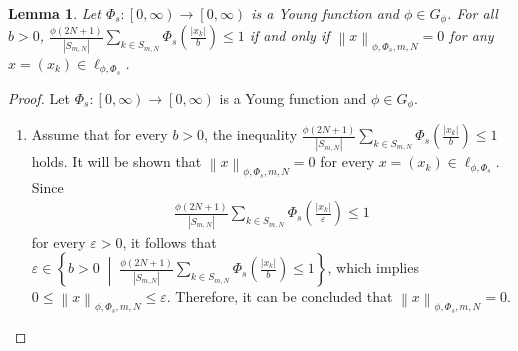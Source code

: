 \documentclass[12pt,a4paper]{article}
\newtheorem{lemma}[definition]{Lemma}
\theoremstyle{remark}
\begin{document}
\begin{lemma}
    Let  $\Phi_s : \left[0, \infty\right) \rightarrow \left[0, \infty\right)$ is a Young function and $\phi\in G_\phi$. For all $b>0$, $\frac{\phi\left(2N+1\right)}{\left|S_{m,N}\right|}\sum_{k\in S_{m,N}}\Phi_s\left(\frac{\left|x_k\right|}{b}\right)\leq1$ if and only if $\left\lVert x\right\rVert _{\phi,\Phi_s,m,N}=0$ for any $x=\left(x_k\right)\in\ell_{\phi,\Phi_s}$.
\end{lemma}

\begin{proof}
    Let  $\Phi_s : \left[0, \infty\right) \rightarrow \left[0, \infty\right)$ is a Young function and $\phi\in G_\phi$.
    \begin{enumerate}
        \item [$(\Leftarrow)$] Assume that for every $b > 0$, the inequality $\frac{\phi(2N+1)}{\left|S_{m,N}\right|} \sum_{k \in S_{m,N}} \Phi_s\left(\frac{\left|x_k\right|}{b}\right) \leq 1$ holds. It will be shown that $\left\lVert x \right\rVert_{\phi, \Phi_s, m, N} = 0$ for every $x = \left(x_k\right) \in \ell_{\phi, \Phi_s}$.\\
        Since 
        \begin{eqnarray*}
            \frac{\phi(2N+1)}{\left|S_{m,N}\right|} \sum_{k \in S_{m,N}} \Phi_s\left(\frac{\left|x_k\right|}{\varepsilon}\right) \leq 1
        \end{eqnarray*}
        for every $\varepsilon > 0$, it follows that $\varepsilon \in \left\{b > 0 \;\middle|\; \frac{\phi(2N+1)}{\left|S_{m,N}\right|} \sum_{k \in S_{m,N}} \Phi_s\left(\frac{\left|x_k\right|}{b}\right) \leq 1\right\}$, which implies $0 \leq \left\lVert x \right\rVert_{\phi, \Phi_s, m, N} \leq \varepsilon$. Therefore, it can be concluded that $\left\lVert x \right\rVert_{\phi, \Phi_s, m, N} = 0$.
        

\end{enumerate}
\end{proof}
\end{document}
